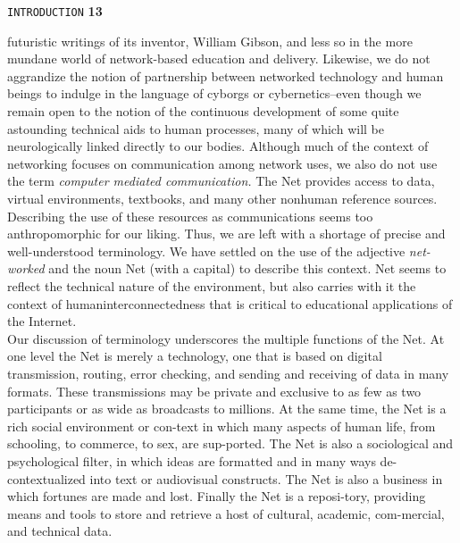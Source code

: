 \documentclass{book}
\begin{document}
\begin{flushright}
 \texttt{INTRODUCTION} \hspace*{1cm} \textbf{13}
\end{flushright}

\vspace*{0.5cm}
futuristic writings of its inventor, William Gibson, and less so in the more mundane world of network-based education and delivery. Likewise, we do not aggrandize the notion of partnership between networked technology and human beings to indulge in the language of cyborgs or cybernetics--even though we remain open to the notion of the continuous development of some quite astounding technical aids to human processes, many of which will be neurologically linked directly to our bodies. Although much of the context of networking focuses on communication among network uses, we also do not use the term \emph{computer mediated communication.} The Net provides access to data, virtual environments, textbooks, and many other nonhuman reference sources. Describing the use of these resources as communications seems too anthropomorphic for our liking. Thus, we are left with a shortage of precise and well-understood terminology. We have settled on the use of the adjective \emph{net-worked} and the noun Net (with a capital) to describe this context. Net seems to reflect the technical nature of the environment, but also carries with it the context of humaninterconnectedness that is critical to educational applications of the Internet.\\

\hspace*{0.4cm} Our discussion of terminology underscores the multiple functions of the Net. At one level the Net is merely a technology, one that is based on digital transmission, routing, error checking, and sending and receiving of data in many formats. These transmissions may be private and exclusive to as few as two participants or as wide as broadcasts to millions. At the same time, the Net is a rich social environment or con-text in which many aspects of human life, from schooling, to commerce, to sex, are sup-ported. The Net is also a sociological and psychological filter, in which ideas are formatted and in many ways de-contextualized into text or audiovisual constructs. The Net is also a business in which fortunes are made and lost. Finally the Net is a reposi-tory, providing means and tools to store and retrieve a host of cultural, academic, com-mercial, and technical data.\\
\end{document}
